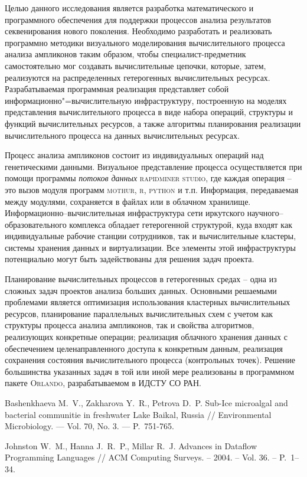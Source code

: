 \documentclass[12pt]{llncs}
\begin{document}
Целью данного исследования является разработка математического и программного обеспечения для поддержки процессов анализа результатов секвенирования нового поколения.  Необходимо разработать и реализовать программно методики визуального моделирования вычислительного процесса анализа ампликонов таким образом, чтобы специалист-предметник самостоятельно мог создавать вычислительные цепочки, которые, затем, реализуются на распределенных гетерогенных вычислительных ресурсах.  Разрабатываемая программная реализация представляет собой информационно"=вычислительную инфраструктуру, построенную на моделях представления вычислительного процесса в виде набора операций, структуры и функций вычислительных ресурсов, а также алгоритмы планирования реализации вычислительного процесса на данных вычислительных ресурсах.

Процесс анализа ампликонов состоит из индивидуальных операций над генетическими данными.  Визуальное представление процесса осуществляется при помощи программы \emph{потоков данных} \cite{dataflow} \textsc{rapidminer studio}, где каждая операция -- это вызов модуля программ \textsc{mothur}, \textsc{r}, \textsc{python} и т.п.  Информация, передаваемая между модулями, сохраняется в файлах или в облачном хранилище.  Информационно--вычислительная инфраструктура сети иркутского научного--образовательного комплекса обладает гетерогенной структурой, куда входят как индивидуальные рабочие станции сотрудников, так и вычислительные кластеры, системы хранения данных и виртуализации.  Все элементы этой инфраструктуры потенциально могут быть задействованы для решения задач проекта.

Планирование вычислительных процессов в гетерогенных средах -- одна из сложных задач проектов анализа больших данных.  Основными решаемыми проблемами является оптимизация использования кластерных вычислительных ресурсов, планирование параллельных вычислительных схем с учетом как структуры процесса анализа ампликонов, так и свойства алгоритмов, реализующих конкретные операции; реализация облачного хранения данных с обеспечением целенаправленного доступа к конкретным данным, реализация сохранения состояния вычислительного процесса (контрольных точек).  Решение большинства указанных задач в той или иной мере реализованы в программном пакете \textsc{Orlando}, разрабатываемом в ИДСТУ СО РАН.


\begin{thebibliography}{9}
 Bashenkhaeva M.~V., Zakharova Y.~R., Petrova D.~P. Sub-Ice microalgal and bacterial communitie in freshwater Lake Baikal, Russia // Environmental Microbiology. — Vol. 70, No. 3. — P.~751-765.

 Johnston W.~M., Hanna J.~R.~P., Millar R.~J. Advances in Dataflow Programming Languages // ACM Computing Surveys. – 2004. – Vol. 36. – P.~1–34.


\end{thebibliography}
\end{document}
